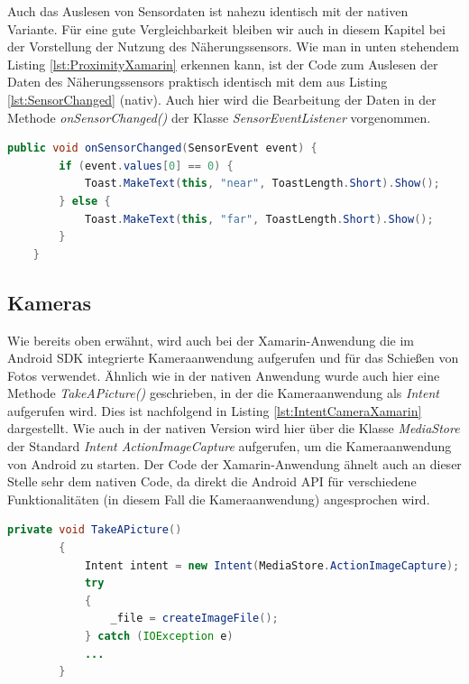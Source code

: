 Auch das Auslesen von Sensordaten ist nahezu identisch mit der nativen Variante. Für eine gute Vergleichbarkeit bleiben wir auch in diesem Kapitel bei der Vorstellung der Nutzung des Näherungssensors. Wie man in unten stehendem Listing \ref{lst:ProximityXamarin} erkennen kann, ist der Code zum Auslesen der Daten des Näherungssensors praktisch identisch mit dem aus Listing \ref{lst:SensorChanged} (nativ). Auch hier wird die Bearbeitung der Daten in der Methode \textit{onSensorChanged()} der Klasse \textit{SensorEventListener} vorgenommen.

\begin{lstlisting}[caption=Auslesen der Daten des Näherungssensors (Xamarin), label=lst:ProximityXamarin, language=Java]
public void onSensorChanged(SensorEvent event) {
        if (event.values[0] == 0) {
            Toast.MakeText(this, "near", ToastLength.Short).Show();
        } else {
            Toast.MakeText(this, "far", ToastLength.Short).Show();
        }
    }
\end{lstlisting}

\subsection*{Kameras}

Wie bereits oben erwähnt, wird auch bei der Xamarin-Anwendung die im Android SDK integrierte Kameraanwendung aufgerufen und für das Schießen von Fotos verwendet. Ähnlich wie in der nativen Anwendung wurde auch hier eine Methode \textit{TakeAPicture()} geschrieben, in der die Kameraanwendung als \textit{Intent} aufgerufen wird. Dies ist nachfolgend in Listing \ref{lst:IntentCameraXamarin} dargestellt. Wie auch in der nativen Version wird hier über die Klasse \textit{MediaStore} der Standard \textit{Intent ActionImageCapture} aufgerufen, um die Kameraanwendung von Android zu starten. Der Code der Xamarin-Anwendung ähnelt auch an dieser Stelle sehr dem nativen Code, da direkt die Android API für verschiedene Funktionalitäten (in diesem Fall die Kameraanwendung) angesprochen wird.
\clearpage 

\begin{lstlisting}[caption=Methode \textit{TakeAPicture()}: Aufruf der Android-Kamerafunktion über einen \textit{Intent} in Xamarin, label=lst:IntentCameraXamarin, language=Java]
private void TakeAPicture()
        {
            Intent intent = new Intent(MediaStore.ActionImageCapture);
            try
            {
                _file = createImageFile();
            } catch (IOException e)
            ...
        }
\end{lstlisting}

